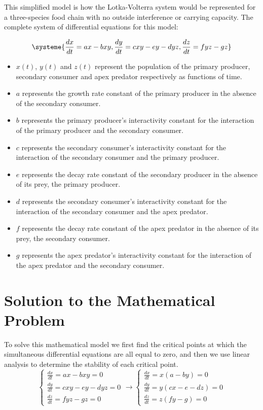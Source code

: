 \documentclass[11pt,oneside]{article}
\begin{document}
	This simplified model is how the Lotka-Volterra system would be represented for a three-species food chain with no outside interference or carrying capacity. The complete system of differential equations for this model:
	
	\begin{equation}
	\systeme{
		\frac{dx}{dt} = ax - bxy,
		\frac{dy}{dt} = cxy - ey -dyz,
		\frac{dz}{dt} = fyz - gz
	}
	\end{equation}
	\begin{itemize}
		\item $x(t)$, $y(t)$ and $z(t)$ represent the population of the primary producer, secondary consumer and apex predator respectively as functions of time.
		\item $a$ represents the growth rate constant of the primary producer in the absence of the secondary consumer.
		\item $b$ represents the primary producer's interactivity constant for the interaction of the primary producer and the secondary consumer.
		\item $c$ represents the secondary consumer's interactivity constant for the interaction of the secondary consumer and the primary producer.
		\item $e$ represents the decay rate constant of the secondary producer in the absence of its prey, the primary producer.
		\item $d$ represents the secondary consumer's interactivity constant for the interaction of the secondary consumer and the apex predator.
		\item $f$ represents the decay rate constant of the apex predator in the absence of its prey, the secondary consumer.
		\item $g$ represents the apex predator's interactivity constant for the interaction of the apex predator and the secondary consumer.
	\end{itemize}
	
	
	\section{Solution to the Mathematical Problem}
	To solve this mathematical model we first find the critical points at which the simultaneous differential equations are all equal to zero, and then we use linear analysis to determine the stability of each critical point. 
	\begin{equation}
	\begin{cases}
	\frac{dx}{dt} = ax - bxy = 0\\
	\frac{dy}{dt} = cxy - ey -dyz = 0\\
	\frac{dz}{dt} = fyz - gz = 0
	\end{cases}
	\rightarrow
	\begin{cases}
	\frac{dx}{dt} = x(a-by) = 0\\
	\frac{dy}{dt} = y(cx - e -dz) = 0\\
	\frac{dz}{dt} = z(fy - g) = 0
	\end{cases}
	\end{equation}
	
\end{document}
